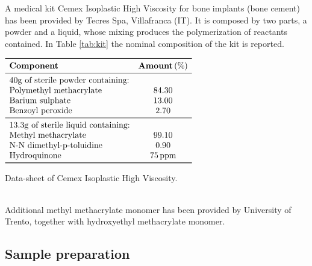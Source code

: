 \documentclass[a4paper, 11pt]{article}
\begin{document}
A medical kit Cemex Isoplastic High Viscosity for bone implants (bone cement) has been provided by Tecres Spa, Villafranca (IT). It is composed by two parts, a powder and a liquid, whose mixing produces the polymerization of reactants contained. In Table \ref{tab:kit} the nominal composition of the kit is reported. 
\begin{table}[htp]
\centering
$
\begin{array}{lc}
\toprule
\textbf{Component} & \textbf{Amount}\,(\%) \\
\midrule
\text{$40\si{g}$ of sterile powder containing:} & \\ 
\text{Polymethyl methacrylate} & 84.30  \\
\text{Barium sulphate} & 13.00  \\
\text{Benzoyl peroxide} & 2.70  \\
\midrule 
\text{$13.3\si{g}$ of sterile liquid containing:} & \\ 
\text{Methyl methacrylate} & 99.10  \\
\text{N-N dimethyl-p-toluidine} & 0.90  \\
\text{Hydroquinone} & 75\,\text{ppm}  \\
\bottomrule
\end{array}
$
\caption{Data-sheet of Cemex Isoplastic High Viscosity.}
\label{tab:kit}
\end{table}\\
Additional methyl methacrylate monomer has been provided by University of Trento, together with hydroxyethyl methacrylate monomer. 

\newpage

\subsection{Sample preparation}
\end{document}
